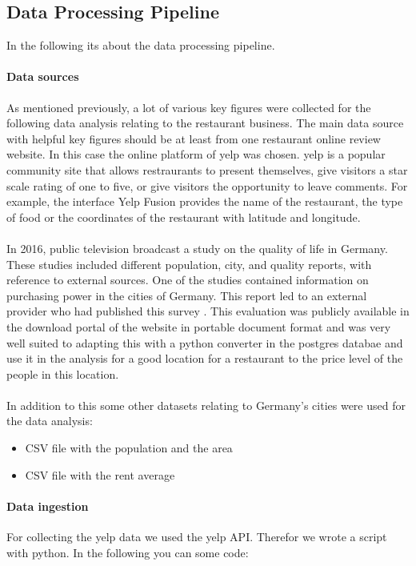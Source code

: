 \subsection{Data Processing Pipeline}
\label{subsec:pipeline}
In the following its about the data processing pipeline.

\paragraph{Data sources}
\label{subsec:Data sources}
As mentioned previously, a lot of various key figures were collected for the following data analysis relating to the restaurant business. The main data source with helpful key figures should be at least from one restaurant online review website. In this case the online platform of yelp was chosen. 
yelp is a popular community site that allows restraurants to present themselves, give visitors a star scale rating of one to five, or give visitors the opportunity to leave comments. For example, the interface Yelp Fusion provides the name of the restaurant, the type of food or the coordinates of the restaurant with latitude and longitude. \\
\\
In 2016, public television broadcast a study on the quality of life in Germany. These studies included different population, city, and quality reports, with reference to external sources. One of the studies contained information on purchasing power in the cities of Germany. This report led to an external provider who had published this survey \cite{BuyingPower}. This evaluation was publicly available in the download portal of the website in portable document format and was very well suited to adapting this with a python converter in the postgres databae and use it in the analysis for a good location for a restaurant to the price level of the people in this location.\\
\\
In addition to this some other datasets relating to Germany's cities were used for the data analysis:
\begin{itemize}
\item CSV file with the population and the area
\item CSV file with the rent average
\end{itemize}

\paragraph{Data ingestion}
\label{subsec:Data ingestion}
For collecting the yelp data we used the yelp API. Therefor we wrote a script with python. In the following you can some code:

